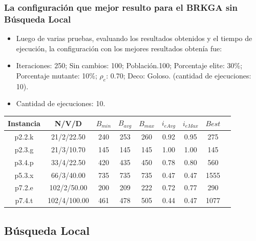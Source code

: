 \documentclass{beamer}
\begin{document}
\begin{frame}
\frametitle{La configuración que mejor resulto para el BRKGA sin Búsqueda Local}

\begin{itemize}
    \item Luego de varias pruebas, evaluando los resultados obtenidos y el tiempo de ejecución, la configuración con los mejores resultados obtenía fue:
    \pause
    \item Iteraciones: 250; Sin cambios: 100; Población.100; Porcentaje elite: 30\%; Porcentaje mutante: 10\%; $\rho_e$: 0.70; Deco: Goloso. (cantidad de ejecuciones: 10).
    \pause
    \item Cantidad de ejecuciones: 10.
\end{itemize}

\begin{table}
\begin{center}
\begin{tabular}{ |c|c|c|c|c|c|c|c|c| } 
\hline
Instancia & N/V/D& $B_{min}$ & $B_{avg}$ & $B_{max}$ & $i_{eAvg}$ & $i_{eMax}$ & $Best$ \\
\hline
p2.2.k & 21/2/22.50 & 240 & 253 & 260 & 0.92 & 0.95 & 275 \\
p2.3.g & 21/3/10.70 & 145 & 145 & 145 & 1.00 & 1.00 & 145 \\
p3.4.p & 33/4/22.50 & 420 & 435 & 450 & 0.78 & 0.80 & 560 \\
p5.3.x & 66/3/40.00 & 735 & 735 & 735 & 0.47 & 0.47 & 1555 \\
p7.2.e & 102/2/50.00 & 200 & 209 & 222 & 0.72 & 0.77 & 290 \\
p7.4.t & 102/4/100.00 & 461 & 478 & 505 & 0.44 & 0.47 & 1077 \\
\hline
\end{tabular}
\end{center}
\label{tab:resultadosBrkgaSinBL}
\end{table}

\end{frame}


\subsection{Búsqueda Local}
\end{document}

